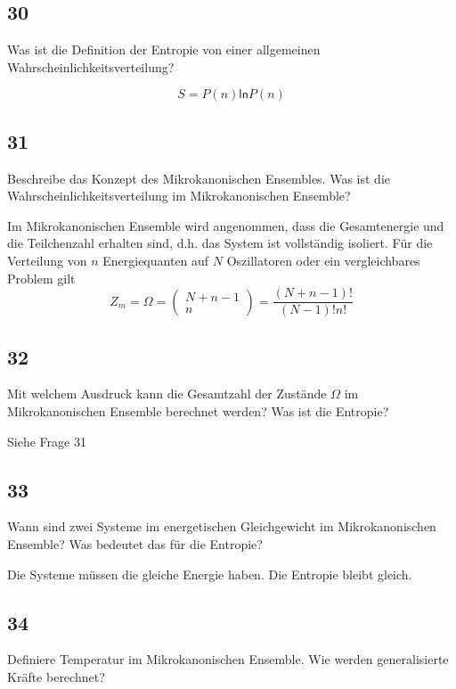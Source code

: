 \documentclass[12pt,a4paper]{report}
\newcommand{\logn}{\mathsf{ln}}
\newcommand{\binkoef}[2]{\left(\begin{array}{c}{#1}\\{#2}\end{array}\right)}
\newenvironment{myfrag}{\begin{it}}{\end{it}\vspace{3mm}\par}
\numberwithin{equation}{section}
\begin{document}
\subsection{30}
\begin{myfrag}
Was ist die Definition der Entropie von einer allgemeinen Wahrscheinlichkeitsverteilung?
\end{myfrag}
\begin{equation}
	S=P(n)\logn P(n)
\end{equation}
\subsection{31}
\begin{myfrag}
Beschreibe das Konzept des Mikrokanonischen Ensembles. Was ist die
Wahrscheinlichkeitsverteilung im Mikrokanonischen Ensemble?
\end{myfrag}
Im Mikrokanonischen Ensemble wird angenommen, dass die Gesamtenergie und die Teilchenzahl erhalten sind, d.h. das System ist vollständig isoliert. Für die Verteilung von $n$ Energiequanten auf $N$ Oszillatoren oder ein vergleichbares Problem gilt
\begin{equation}
	Z_m=\Omega=\binkoef{N+n-1}{n}=\frac{(N+n-1)!}{(N-1)!n!}
\end{equation}
\subsection{32}
\begin{myfrag}
Mit welchem Ausdruck kann die Gesamtzahl der Zustände $\Omega$ im
Mikrokanonischen Ensemble berechnet werden? Was ist die Entropie?
\end{myfrag}
Siehe Frage 31 %
\subsection{33}
\begin{myfrag}
Wann sind zwei Systeme im energetischen Gleichgewicht im Mikrokanonischen
Ensemble? Was bedeutet das für die Entropie?
\end{myfrag}
Die Systeme müssen die gleiche Energie haben. Die Entropie bleibt gleich. %
\subsection{34}
\begin{myfrag}
Definiere Temperatur im Mikrokanonischen Ensemble. Wie werden
generalisierte Kräfte berechnet?
\end{myfrag}
\end{document}
